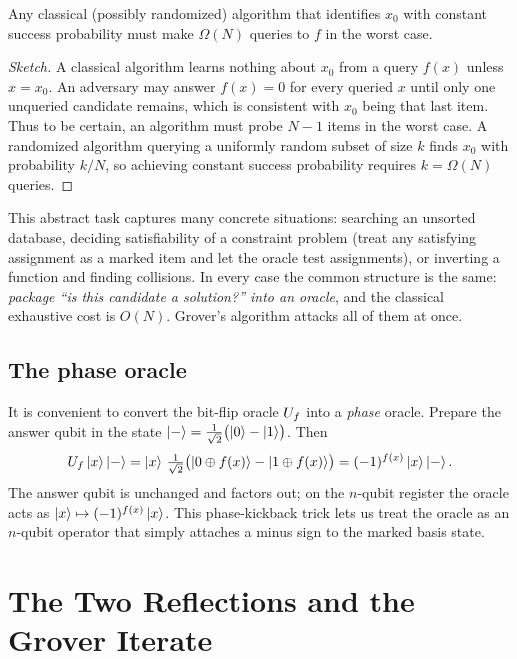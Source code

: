 \begin{proposition}
Any classical (possibly randomized) algorithm that identifies $x_0$ with constant
success probability must make $\Omega(N)$ queries to $f$ in the worst case.
\end{proposition}

\begin{proof}[Sketch]
A classical algorithm learns nothing about $x_0$ from a query $f(x)$ unless
$x=x_0$. An adversary may answer $f(x)=0$ for every queried $x$ until only one
unqueried candidate remains, which is consistent with $x_0$ being that last item.
Thus to be certain, an algorithm must probe $N-1$ items in the worst case. A
randomized algorithm querying a uniformly random subset of size $k$ finds $x_0$
with probability $k/N$, so achieving constant success probability requires
$k=\Omega(N)$ queries.
\end{proof}

This abstract task captures many concrete situations: searching an unsorted
database, deciding satisfiability of a constraint problem (treat any satisfying
assignment as a marked item and let the oracle test assignments), or inverting a
function and finding collisions. In every case the common structure is the same:
\emph{package ``is this candidate a solution?'' into an oracle}, and the classical
exhaustive cost is $O(N)$. Grover's algorithm attacks all of them at once.

\subsection{The phase oracle}

It is convenient to convert the bit-flip oracle $U_f$ into a \emph{phase} oracle.
Prepare the answer qubit in the state
$\ket{-}=\tfrac{1}{\sqrt2}\bigl(\ket{0}-\ket{1}\bigr)$. Then
\[
  U_f\ket{x}\ket{-}
    =\ket{x}\,\tfrac{1}{\sqrt2}\bigl(\ket{0\oplus f(x)}-\ket{1\oplus f(x)}\bigr)
    =(-1)^{f(x)}\ket{x}\ket{-}.
\]
The answer qubit is unchanged and factors out; on the $n$-qubit register the
oracle acts as $\ket{x}\mapsto(-1)^{f(x)}\ket{x}$. This phase-kickback trick lets
us treat the oracle as an $n$-qubit operator that simply attaches a minus sign to
the marked basis state.

\section{The Two Reflections and the Grover Iterate}

